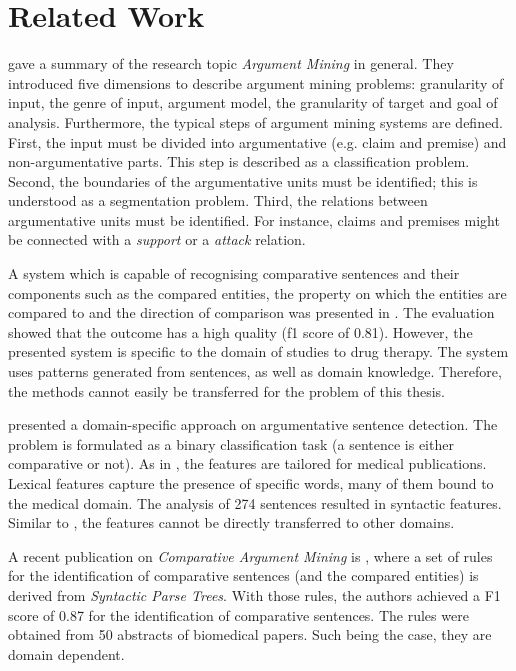 \section{Related Work}
\label{sec:argth}
\label{sec:argmine}
\cite{Lippi2016Argumentation-M} gave a summary of the research topic \emph{Argument Mining} in general. They introduced five dimensions to describe argument mining problems: granularity of input, the genre of input, argument model, the granularity of target and goal of analysis.  Furthermore, the typical steps of argument mining systems are defined. First, the input must be divided into argumentative (e.g. claim and premise) and non-argumentative parts. This step is described as a classification problem. Second, the boundaries of the argumentative units must be identified; this is understood as a segmentation problem. Third, the relations between argumentative units must be identified. For instance, claims and premises might be connected with a \emph{support} or a \emph{attack} relation.




A system which is capable of recognising comparative sentences and their components such as the compared entities, the property on which the entities are compared to and the direction of comparison was presented in \cite{fiszman2007interpreting}. The evaluation showed that the outcome has a high quality (f1 score of 0.81). However, the presented system is specific to the domain of studies to drug therapy. The system uses patterns generated from sentences, as well as domain knowledge. Therefore, the methods cannot easily be transferred for the problem of this thesis.

\cite{park2012identifying} presented a domain-specific approach on argumentative sentence detection. The problem is formulated as a binary classification task (a sentence is either comparative or not). As in \cite{fiszman2007interpreting}, the features are tailored for medical publications. Lexical features capture the presence of specific words, many of them bound to the medical domain. The analysis of 274 sentences resulted in syntactic features. Similar to \cite{fiszman2007interpreting}, the features cannot be directly transferred to other domains.

A recent publication on \emph{Comparative Argument Mining} is \cite{gupta2017identifying}, where a set of rules for the identification of comparative sentences (and the compared entities) is derived from \emph{Syntactic Parse Trees}. With those rules, the authors achieved a F1 score of 0.87 for the identification of comparative sentences. The rules were obtained from 50 abstracts of biomedical papers. Such being the case, they are domain dependent.\newline


